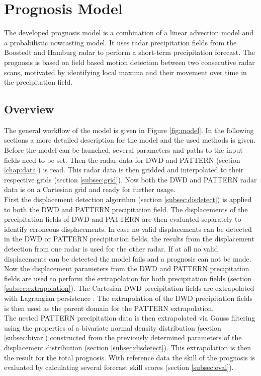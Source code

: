 \documentclass[11pt,twoside,a4paper,fleqn,x11names]{report}
\numberwithin{equation}{chapter}
\numberwithin{figure}{chapter}
\numberwithin{table}{chapter}
\begin{document}
\chapter{Prognosis Model}
The developed prognosis model is a combination of a linear advection model and a probabilistic nowcasting model. It uses radar precipitation fields from the Boostedt and Hamburg radar to perform a short-term precipitation forecast. The prognosis is based on field based motion detection between two consecutive radar scans, motivated by identifying local maxima and their movement over time in the precipitation field.
\section{Overview}
The general workflow of the model is given in Figure \ref{fig:model}. In the following sections a more detailed description for the model and the used methods is given. Before the model can be launched, several parameters and paths to the input fields need to be set. %
Then the radar data for DWD and PATTERN (section \ref{chap:data}) is read. This radar data is then gridded and interpolated to their respective grids (section \ref{subsec:grid}). Now both the DWD and PATTERN radar data is on a Cartesian grid and ready for further usage. \\
First the displacement detection algorithm (section \ref{subsec:disdetect}) is applied to both the DWD and PATTERN precipitation field. The displacements of the precipitation fields of DWD and PATTERN are then evaluated separately to identify erroneous displacements. In case no valid displacements can be detected in the DWD or PATTERN precipitation fields, the results from the displacement detection from one radar is used for the other radar. If at all no valid displacements can be detected the model fails and a prognosis can not be made. \\
Now the displacement parameters from the DWD and PATTERN precipitation fields are used to perform the extrapolation for both precipitation fields (section \ref{subsec:extrapolation}). The Cartesian DWD precipitation fields are extrapolated with Lagrangian persistence \citep{Germann}. The extrapolation of the DWD precipitation fields is then used as the parent domain for the PATTERN extrapolation. \\
The nested PATTERN precipitation data is then extrapolated via Gauss filtering using the properties of a bivariate normal density distribution (section \ref{subsec:bivar}) constructed from the previously determined parameters of the displacement distribution (section \ref{subsec:disdetect}). This extrapolation is then the result for the total prognosis. With reference data the skill of the prognosis is evaluated by calculating several forecast skill scores (section \ref{subsec:eval}).
\end{document}
